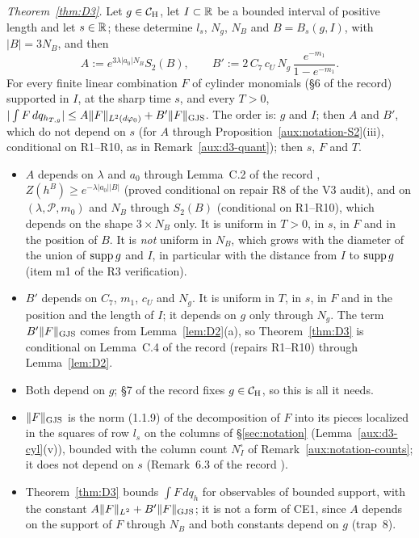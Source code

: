 \emph{Theorem~\ref{thm:D3}.} Let $g\in\mathcal{C}_{\mathrm H}$, let $I\subset\mathbb{R}$ be a bounded interval of positive
length and let $s\in\mathbb{R}$; these determine $l_s$, $N_g$, $N_B$ and $B=B_s(g,I)$, with $|B|=3N_B$, and then
\[
 A:=e^{3\lambda|a_0|N_B}S_2(B),\qquad
 B':=2\,C_7\,c_U\,N_g\,\frac{e^{-m_1}}{1-e^{-m_1}} .
\]
For every finite linear combination $F$ of cylinder monomials (\S6 of the record) supported in
$I$, at the sharp time $s$, and every $T>0$,
$|\int F\,dq_{h_{T,g}}|\le A\|F\|_{L^2(d\varphi_0)}+B'\lVert F\rVert_{\mathrm{GJS}}$. The order is: $g$ and $I$; then
$A$ and $B'$, which do not depend on $s$ (for $A$ through Proposition~\ref{aux:notation-S2}(iii),
conditional on R1--R10, as in Remark~\ref{aux:d3-quant}); then $s$, $F$ and $T$.
\begin{itemize}
\item $A$ depends on $\lambda$ and $a_0$ through Lemma~C.2 of the record \cite[p.~40]{R},
$Z(h^B)\ge e^{-\lambda|a_0||B|}$ (proved conditional on repair R8 of the V3 audit), and on
$(\lambda,\mathscr P,m_0)$ and $N_B$ through $S_2(B)$ (conditional on R1--R10), which depends
on the shape $3\times N_B$ only. It is uniform in $T>0$, in $s$, in
$F$ and in the position of $B$. It is \emph{not} uniform in $N_B$, which grows with the
diameter of the union of $\operatorname{supp} g$ and $I$, in particular with the distance from $I$ to
$\operatorname{supp} g$ (item m1 of the R3 verification).
\item $B'$ depends on $C_7$, $m_1$, $c_U$ and $N_g$. It is uniform in $T$, in $s$, in $F$
and in the position and the length of $I$; it depends on $g$ only through $N_g$.  The term
$B'\lVert F\rVert_{\mathrm{GJS}}$ comes from Lemma~\ref{lem:D2}(a), so Theorem~\ref{thm:D3} is conditional on
Lemma~C.4 of the record (repairs R1--R10) through Lemma~\ref{lem:D2}.
\item Both depend on $g$; \S7 of the record fixes $g\in\mathcal{C}_{\mathrm H}$, so this is all it needs.
\item $\lVert F\rVert_{\mathrm{GJS}}$ is the norm (1.1.9) of the decomposition of $F$ into its pieces localized in
the squares of row $l_s$ on the columns of \S\ref{sec:notation}
(Lemma~\ref{aux:d3-cyl}(v)), bounded with the column count $N^\square_I$ of
Remark~\ref{aux:notation-counts}; it does not depend on $s$ (Remark~6.3 of the record
\cite[p.~20]{R}).
\item Theorem~\ref{thm:D3} bounds $\int F\,dq_h$ for observables of bounded support, with
the constant $A\|F\|_{L^2}+B'\lVert F\rVert_{\mathrm{GJS}}$; it is not a form of CE1, since $A$ depends on the
support of $F$ through $N_B$ and both constants depend on $g$ (trap~8).
\end{itemize}

